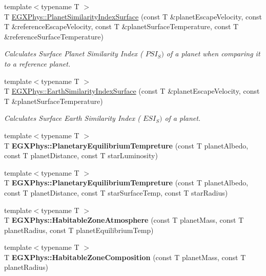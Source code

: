 \begin{DoxyCompactItemize}
{\footnotesize template$<$typename T $>$ }\\T \hyperlink{group___astrophysics_gae0c7dce2779d66b0560ca388a34ddc39}{E\+G\+X\+Phys\+::\+Planet\+Similarity\+Index\+Surface} (const T \&planet\+Escape\+Velocity, const T \&reference\+Escape\+Velocity, const T \&planet\+Surface\+Temperature, const T \&reference\+Surface\+Temperature)
\begin{DoxyCompactList}\small\item\em Calculates Surface Planet Similarity Index ( $PSI_S)$ of a planet when comparing it to a reference planet. \end{DoxyCompactList}\item 
{\footnotesize template$<$typename T $>$ }\\T \hyperlink{group___astrophysics_ga1df772b0ed354ca7f7e4a7a4af072325}{E\+G\+X\+Phys\+::\+Earth\+Similarity\+Index\+Surface} (const T \&planet\+Escape\+Velocity, const T \&planet\+Surface\+Temperature)
\begin{DoxyCompactList}\small\item\em Calculates Surface Earth Similarity Index ( $ESI_S)$ of a planet. \end{DoxyCompactList}\item 
\mbox{\label{group___astrophysics_gaeac3ced5104701ee02fc100f7cf4c189}} 
{\footnotesize template$<$typename T $>$ }\\T {\bfseries E\+G\+X\+Phys\+::\+Planetary\+Equilibrium\+Tempreture} (const T planet\+Albedo, const T planet\+Distance, const T star\+Luminosity)
\item 
\mbox{\label{group___astrophysics_ga099c12876fba6deb13ae2cf0e92644fe}} 
{\footnotesize template$<$typename T $>$ }\\T {\bfseries E\+G\+X\+Phys\+::\+Planetary\+Equilibrium\+Tempreture} (const T planet\+Albedo, const T planet\+Distance, const T star\+Surface\+Temp, const T star\+Radius)
\item 
\mbox{\label{group___astrophysics_ga0814237dccfe3c968b97fa6c93aeca27}} 
{\footnotesize template$<$typename T $>$ }\\T {\bfseries E\+G\+X\+Phys\+::\+Habitable\+Zone\+Atmosphere} (const T planet\+Mass, const T planet\+Radius, const T planet\+Equilibrium\+Temp)
\item 
\mbox{\label{group___astrophysics_ga14ab036f8c617512236522c8e31dd072}} 
{\footnotesize template$<$typename T $>$ }\\T {\bfseries E\+G\+X\+Phys\+::\+Habitable\+Zone\+Composition} (const T planet\+Mass, const T planet\+Radius)
\end{DoxyCompactItemize}


